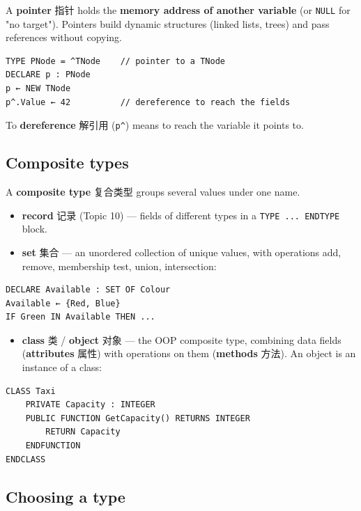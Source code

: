 \documentclass[11pt]{article}
\begin{document}
A \textbf{pointer} 指针 holds the \textbf{memory address of another variable} (or \texttt{NULL} for "no target"). Pointers build dynamic structures (linked lists, trees) and pass references without copying.

\begin{Verbatim}
TYPE PNode = ^TNode    // pointer to a TNode
DECLARE p : PNode
p ← NEW TNode
p^.Value ← 42          // dereference to reach the fields
\end{Verbatim}

To \textbf{dereference} 解引用 (\texttt{p\textasciicircum{}}) means to reach the variable it points to.

\subsection*{Composite types}

A \textbf{composite type} 复合类型 groups several values under one name.

\begin{itemize}
\item \textbf{record} 记录 (Topic 10) — fields of different types in a \texttt{TYPE ... ENDTYPE} block.

\item \textbf{set} 集合 — an unordered collection of unique values, with operations add, remove, membership test, union, intersection:

\end{itemize}

\begin{Verbatim}
DECLARE Available : SET OF Colour
Available ← {Red, Blue}
IF Green IN Available THEN ...
\end{Verbatim}

\begin{itemize}
\item \textbf{class} 类 / \textbf{object} 对象 — the OOP composite type, combining data fields (\textbf{attributes} 属性) with operations on them (\textbf{methods} 方法). An object is an instance of a class:

\end{itemize}

\begin{Verbatim}
CLASS Taxi
    PRIVATE Capacity : INTEGER
    PUBLIC FUNCTION GetCapacity() RETURNS INTEGER
        RETURN Capacity
    ENDFUNCTION
ENDCLASS
\end{Verbatim}

\subsection*{Choosing a type}
\end{document}
